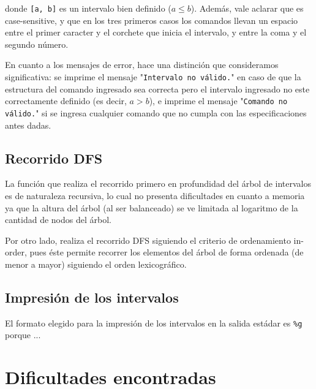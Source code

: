 \documentclass[11pt]{article}
\begin{document}
\noindent donde \verb|[a, b]| es un intervalo bien definido ($a \le b$).
Además, vale aclarar que es case-sensitive, y que en los tres primeros casos los comandos llevan un espacio entre el primer caracter y el corchete que inicia el intervalo, y entre la coma y el segundo número. \par

En cuanto a los mensajes de error, hace una distinción que consideramos significativa: se imprime el mensaje "\verb|Intervalo no válido.|" en caso de que la estructura del comando ingresado sea correcta pero el intervalo ingresado no este correctamente definido (es decir, $a > b$), e imprime el mensaje "\verb|Comando no válido.|" si se ingresa cualquier comando que no cumpla con las especificaciones antes dadas. \par

\subsection{Recorrido DFS}

La función que realiza el recorrido primero en profundidad del árbol de intervalos es de naturaleza recursiva, lo cual no presenta dificultades en cuanto a memoria ya que la altura del árbol (al ser balanceado) se ve limitada al logaritmo de la cantidad de nodos del árbol. \par
Por otro lado, realiza el recorrido DFS siguiendo el criterio de ordenamiento in-order, pues éste permite recorrer los elementos del árbol de forma ordenada (de menor a mayor) siguiendo el orden lexicográfico. \par

\subsection{Impresión de los intervalos}

El formato elegido para la impresión de los intervalos en la salida estádar es \verb|%g| porque ... 


\section{Dificultades encontradas}
\end{document}
